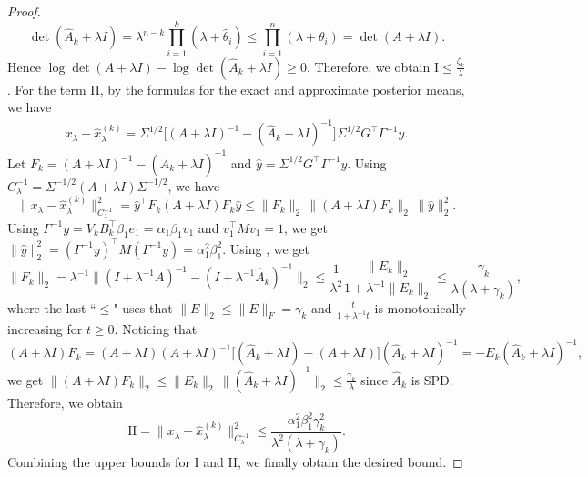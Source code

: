 \documentclass[]{myarticle}
\begin{document}
\begin{proof}
\begin{equation*}
    \det(\widehat A_k+\lambda I) = \lambda^{n-k}\prod_{i=1}^k(\lambda+\hat{\theta}_i) 
    \le \prod_{i=1}^n(\lambda+\theta_i) = \det(A+\lambda I).
  \end{equation*}
  Hence $\log\det(A+\lambda I)-\log\det(\widehat A_k+\lambda I)\ge 0$. Therefore, we obtain $\text{I}\le\frac{\zeta_k}{\lambda}$. For the term II, by the formulas for the exact and approximate posterior means, we have
  \begin{align*}
    x_\lambda-\widehat x_\lambda^{(k)}
    = \Sigma^{1/2}\Big[(A+\lambda I)^{-1}-(\widehat A_k+\lambda I)^{-1}\Big]\Sigma^{1/2}G^\top\Gamma^{-1}y .
  \end{align*} 
  Let $F_k=(A+\lambda I)^{-1}-(\widehat A_k+\lambda I)^{-1}$ and $\hat{y}=\Sigma^{1/2}G^\top\Gamma^{-1}y$. Using $C_{\lambda}^{-1}=\Sigma^{-1/2}(A+\lambda I)\Sigma^{-1/2}$, we have 
  \begin{equation*}
    \|x_\lambda-\widehat x_\lambda^{(k)}\|_{C_\lambda^{-1}}^2 
    = \hat{y}^{\top}F_{k}(A+\lambda I)F_{k}\hat{y}
    \leq \|F_{k}\|_2 \, \|(A+\lambda I)F_{k}\|_2 \, \|\hat{y}\|_2^2 .
  \end{equation*}
  Using $\Gamma^{-1}y=V_k B_k^\top \beta_1 e_1=\alpha_1\beta_1v_1$ and $v_1^{\top}Mv_{1}=1$, we get $\|\hat{y}\|_{2}^2=(\Gamma^{-1}y)^{\top}M(\Gamma^{-1}y)=\alpha_1^2\beta_1^2$. Using , we get 
  \begin{equation*}
    \|F_k\|_2 = \lambda^{-1}\|(I+\lambda^{-1}A)^{-1}-(I+\lambda^{-1}\widehat{A}_k)^{-1}\|_2
    \leq \frac{1}{\lambda^2}\frac{\|E_k\|_2}{1+\lambda^{-1}\|E_k\|_2} \leq \frac{\gamma_k}{\lambda(\lambda+\gamma_k)},
  \end{equation*}
  where the last ``$\le$" uses that $\|E\|_2\le\|E\|_{F}=\gamma_k$ and $\frac{t}{1+\lambda^{-1}t}$ is monotonically increasing for $t\geq 0$. Noticing that 
  \begin{equation*}
    (A+\lambda I)F_k=(A+\lambda I)(A+\lambda I)^{-1}\Big[(\widehat A_k+\lambda I)-(A+\lambda I)\Big](\widehat{A}_k+\lambda I)^{-1} = -E_{k}(\widehat{A}_k+\lambda I)^{-1},
  \end{equation*}
  we get $\|(A+\lambda I)F_{k}\|_2 \leq \|E_k\|_2 \, \|(\widehat{A}_k+\lambda I)^{-1}\|_2
    \leq \frac{\gamma_k}{\lambda}$ since $\widehat{A}_k$ is SPD. Therefore, we obtain
    \begin{equation}\label{mean_err_bnd}
      \text{II} = \|x_\lambda-\widehat x_\lambda^{(k)}\|_{C_\lambda^{-1}}^2 
      \leq \frac{\alpha_1^2\beta_1^2\gamma_k^2}{\lambda^2(\lambda+\gamma_k)} .
    \end{equation}
    Combining the upper bounds for I and II, we finally obtain the desired bound.
\end{proof}
\end{document}
